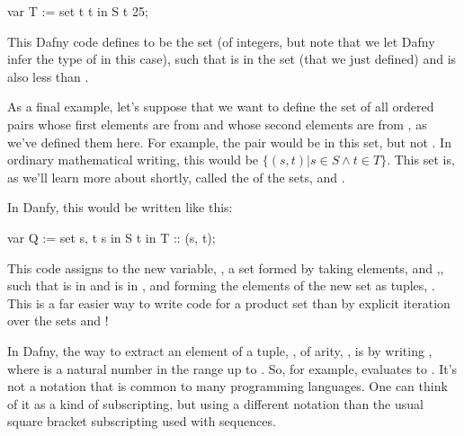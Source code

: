 \documentclass[letterpaper,10pt,english]{sphinxmanual}
\begin{document}
\begin{sphinxVerbatim}[commandchars=\\\{\}]
var T := set t \textbar{} t in S \PYGZam{}\PYGZam{} t \PYGZlt{} 25;
\end{sphinxVerbatim}

This Dafny code defines  to be the set (of integers, but note that
we let Dafny infer the type of  in this case), such that  is in
the set  (that we just defined) and  is also less than .

As a final example, let’s suppose that we want to define the set of
all ordered pairs whose first elements are from  and whose second
elements are from , as we’ve defined them here. For example, the
pair  would be in this set, but not . In ordinary
mathematical writing, this would be \(\{ (s,t) | s \in S \land t
\in T\}.\) This set is, as we’ll learn more about shortly, called the
 of the sets,  and .

In Danfy, this would be written like this:

\begin{sphinxVerbatim}[commandchars=\\\{\}]
var Q := set s, t \textbar{} s in S \PYGZam{}\PYGZam{} t in T :: (s, t);
\end{sphinxVerbatim}

This code assigns to the new variable, , a set formed by taking
elements,  and ,, such that  is in  and  is in , and
forming the elements of the new set as tuples, . This is a far
easier way to write code for a product set than by explicit iteration
over the sets  and !

In Dafny, the way to extract an element of a tuple, , of arity,
, is by writing , where  is a natural number in the range
 up to . So, for example,  evaluates to . It’s
not a notation that is common to many programming languages. One can
think of it as a kind of subscripting, but using a different notation
than the usual square bracket subscripting used with sequences.
\end{document}
